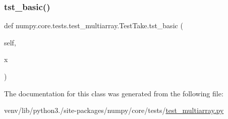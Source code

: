 \mbox{\label{classnumpy_1_1core_1_1tests_1_1test__multiarray_1_1TestTake_a599b059ef52eab32b58af7872f79ef41}} 
\subsubsection{\texorpdfstring{tst\+\_\+basic()}{tst\_basic()}}
{\footnotesize\ttfamily def numpy.\+core.\+tests.\+test\+\_\+multiarray.\+Test\+Take.\+tst\+\_\+basic (\begin{DoxyParamCaption}\item[{}]{self,  }\item[{}]{x }\end{DoxyParamCaption})}



The documentation for this class was generated from the following file\+:\begin{DoxyCompactItemize}
\item 
venv/lib/python3./site-\/packages/numpy/core/tests/\hyperlink{core_2tests_2test__multiarray_8py}{test\+\_\+multiarray.\+py}\end{DoxyCompactItemize}
